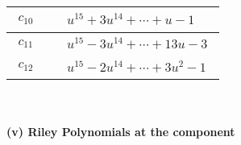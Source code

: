 \documentclass[1p]{elsarticle_modified}
\theoremstyle{definition}
\begin{document}
\begin{tabular}{m{50pt}|m{274pt}}
\hline $$\begin{aligned}c_{10}\end{aligned}$$&$\begin{aligned}
&u^{15}+3 u^{14}+\cdots+u-1
\end{aligned}$\\
\hline $$\begin{aligned}c_{11}\end{aligned}$$&$\begin{aligned}
&u^{15}-3 u^{14}+\cdots+13 u-3
\end{aligned}$\\
\hline $$\begin{aligned}c_{12}\end{aligned}$$&$\begin{aligned}
&u^{15}-2 u^{14}+\cdots+3 u^2-1
\end{aligned}$\\
\hline
\end{tabular}\\~\\
\newpage\renewcommand{\arraystretch}{1}
\flushleft \textbf{(v) Riley Polynomials at the component}\newline \\
\end{document}
